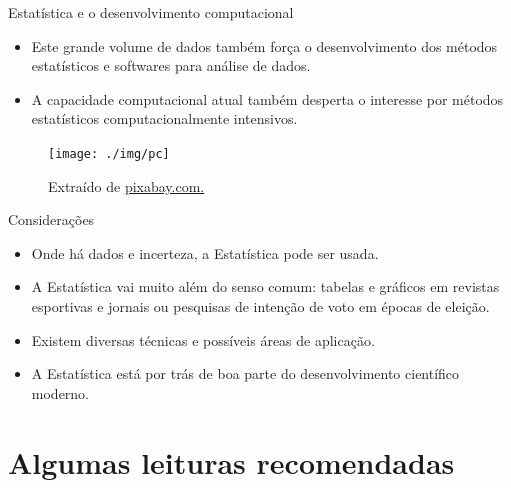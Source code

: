 \documentclass[
  ignorenonframetext,
  serif,
  professionalfont,
  usenames,
  dvipsnames,
  aspectratio = 169]{beamer}
\providecommand{\tightlist}{%
  \setlength{\itemsep}{0pt}\setlength{\parskip}{0pt}}
\renewcommand{\tightlist}{%
  \setlength{\itemsep}{0\baselineskip}
  \setlength{\parskip}{0.25\baselineskip}
}
\def\beginAHalfColumn{\begin{minipage}{0.49\textwidth}}%
\def\endColumns{\end{minipage}}%
\begin{document}
\begin{frame}{Estatística e o desenvolvimento computacional}
\label{estatuxedstica-e-o-desenvolvimento-computacional-3}
\beginAHalfColumn

\begin{itemize}
\tightlist
\item
  Este grande volume de dados também força o desenvolvimento dos métodos
  estatísticos e softwares para análise de dados.
\end{itemize}

\vspace{0.3cm}

\begin{itemize}
\tightlist
\item
  A capacidade computacional atual também desperta o interesse por
  métodos estatísticos computacionalmente intensivos.
\end{itemize}

\endColumns
\beginAHalfColumn

\begin{figure}

{\centering \texttt{[image: ./img/pc]} 

}

\caption{Extraído de \href{https://images.pexels.com/photos/5496463/pexels-photo-5496463.jpeg?auto=compress&cs=tinysrgb&w=1260&h=750&dpr=1}{pixabay.com.}}\label{fig:unnamed-chunk-12}
\end{figure}

\endColumns
\end{frame}

\begin{frame}{Considerações}
\label{considerauxe7uxf5es}
\begin{itemize}
\item
  Onde há dados e incerteza, a Estatística pode ser usada.
\item
  A Estatística vai muito além do senso comum: tabelas e gráficos em
  revistas esportivas e jornais ou pesquisas de intenção de voto em
  épocas de eleição.
\item
  Existem diversas técnicas e possíveis áreas de aplicação.
\item
  A Estatística está por trás de boa parte do desenvolvimento científico
  moderno.
\end{itemize}
\end{frame}

\section{Algumas leituras
recomendadas}\label{algumas-leituras-recomendadas}
\end{document}
